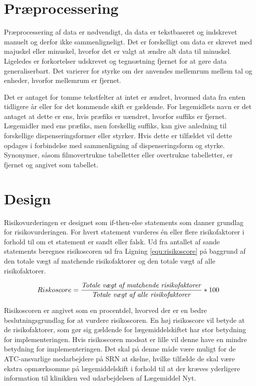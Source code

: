 \section{Præprocessering}
Præprocessering af data er nødvendigt, da data er tekstbaseret og indskrevet manuelt og derfor ikke sammenligneligt. Det er forskelligt om data er skrevet med majuskel eller minuskel, hvorfor det er valgt at ændre alt data til minuskel. Ligeledes er forkortelser udskrevet og tegnsætning fjernet for at gøre data generaliserbart. Det varierer for styrke om der anvendes mellemrum mellem tal og enheder, hvorfor mellemrum er fjernet.

Det er antaget for tomme tekstfelter at intet er ændret, hvormed data fra enten tidligere år eller for det kommende skift er gældende. For lægemidlets navn er det antaget at dette er ens, hvis præfiks er uændret, hvorfor suffiks er fjernet. Lægemidler med ens præfiks, men forskellig suffiks, kan give anledning til forskellige dispenseringsformer eller styrker. Hvis dette er tilfældet vil dette opdages i forbindelse med sammenligning af dispenseringsform og styrke. Synonymer, såsom filmovertrukne tabelletter eller overtrukne tabelletter, er fjernet og angivet som tabellet. 

\section{Design}
Risikovurderingen er designet som if-then-else statements som danner grundlag for risikovurderingen. For hvert statement vurderes én eller flere risikofaktorer i forhold til om et statement er sandt eller falsk. Ud fra antallet af sande statements beregnes risikoscoren ud fra Ligning \ref{equ:risikoscore} på baggrund af den totale vægt af matchende risikofaktorer og den totale vægt af alle risikofaktorer.

\begin{equation}  \label{equ:risikoscore}
Riskoscore = \frac{\mbox{\textit{Totale vægt af matchende risikofaktorer}}}{\mbox{\textit{Totale vægt af alle risikofaktorer}}} * 100
\end{equation}

Risikoscoren er angivet som en procentdel, hvorved der er en bedre beslutningsgrundlag for at vurdere risikoscoren. En høj risikoscore vil betyde at de risikofaktorer, som gør sig gældende for lægemiddelskiftet har stor betydning for implementeringen. Hvis risikoscoren modsat er lille vil denne have en mindre betydning for implementeringen. Det skal på denne måde være muligt for de ATC-ansvarlige medarbejdere på SRN at skelne, hvilke tilfælde de skal være ekstra opmærksomme på lægemiddelskift i forhold til at der kræves yderligere information til klinikken ved udarbejdelsen af Lægemiddel Nyt.  


